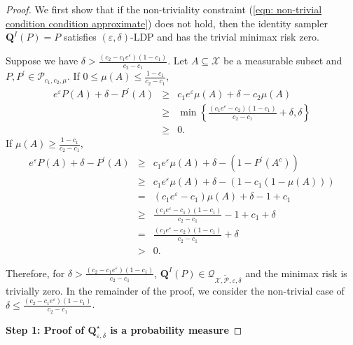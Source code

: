 \documentclass[accepted]{article}
\theoremstyle{plain} %
\theoremstyle{definition}
\theoremstyle{remark}
\newcommand{\eps}{\varepsilon}
\newcommand{\bQ}{\mathbf{Q}}
\begin{document}
\begin{proof}
We first show that if the non-triviality constraint (\ref{eqn: non-trivial condition condition approximate}) does not hold, then the identity sampler $\bQ^I(P) = P$ satisfies $(\eps,\delta)$-LDP and has the trivial minimax risk zero.  

Suppose we have $\delta>\frac{(c_2-c_1e^\eps)(1-c_1)}{c_2-c_1}$. Let $A\subseteq\mathcal{X}$ be a measurable subset and $P,P^\prime\in\mathcal{P}_{c_1,c_2,\mu}$. If $0\leq\mu(A)\leq\frac{1-c_1}{c_2-c_1}$,
\begin{eqnarray*}
    e^\eps P(A)+\delta-P^\prime(A)&\geq&c_1e^\eps\mu(A)+\delta-c_2\mu(A)\\
    &\geq&\min\left\{\frac{(c_1e^\eps-c_2)(1-c_1)}{c_2-c_1}+\delta,\delta\right\}\\
    &\geq&0.
\end{eqnarray*}
If $\mu(A)\geq\frac{1-c_1}{c_2-c_1}$,
\begin{eqnarray*}
    e^\eps P(A)+\delta-P^\prime(A)&\geq&c_1e^\eps\mu(A)+\delta-(1-P^\prime(A^c))\\
    &\geq&c_1e^\eps\mu(A)+\delta-(1-c_1(1-\mu(A)))\\
    &=&(c_1e^\eps-c_1)\mu(A)+\delta-1+c_1\\
    &\geq&\frac{(c_1e^\eps-c_1)(1-c_1)}{c_2-c_1}-1+c_1+\delta\\
    &=&\frac{(c_1e^\eps-c_2)(1-c_1)}{c_2-c_1}+\delta\\
    &>&0.
\end{eqnarray*}

Therefore, for $\delta>\frac{(c_2-c_1e^\eps)(1-c_1)}{c_2-c_1}$, $\bQ^I(P) \in \mathcal{Q}_{\mathcal{X}, \tilde{\mathcal{P}}, \varepsilon, \delta}$ and the minimax risk is trivially zero. In the remainder of the proof, we consider the non-trivial case of $\delta \leq \frac{(c_2-c_1e^\eps)(1-c_1)}{c_2-c_1}$.

   \medskip
   
    \textbf{Step 1: Proof of $\bQ^\star_{\varepsilon, \delta}$ is a probability measure} 


\end{proof}
\end{document}
